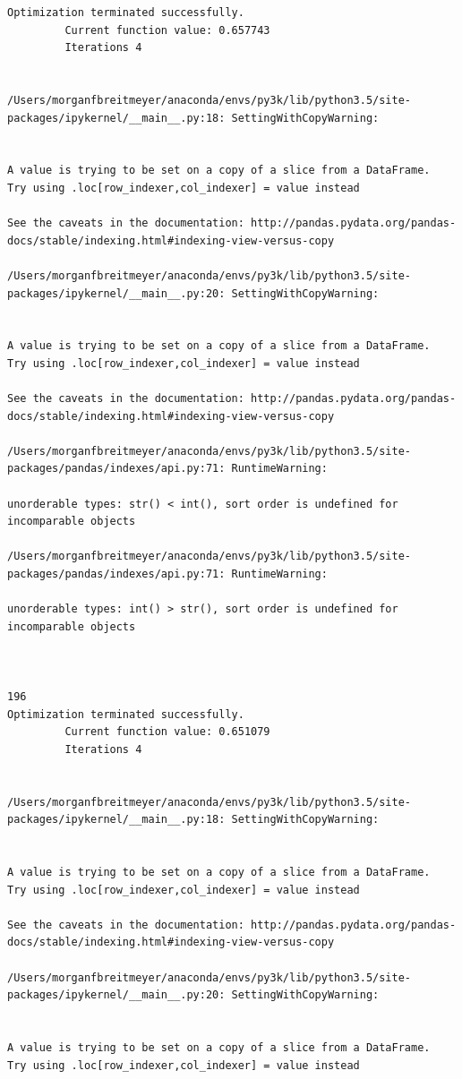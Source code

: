 \begin{lstlisting}
Optimization terminated successfully.
         Current function value: 0.657743
         Iterations 4


/Users/morganfbreitmeyer/anaconda/envs/py3k/lib/python3.5/site-packages/ipykernel/__main__.py:18: SettingWithCopyWarning:


A value is trying to be set on a copy of a slice from a DataFrame.
Try using .loc[row_indexer,col_indexer] = value instead

See the caveats in the documentation: http://pandas.pydata.org/pandas-docs/stable/indexing.html#indexing-view-versus-copy

/Users/morganfbreitmeyer/anaconda/envs/py3k/lib/python3.5/site-packages/ipykernel/__main__.py:20: SettingWithCopyWarning:


A value is trying to be set on a copy of a slice from a DataFrame.
Try using .loc[row_indexer,col_indexer] = value instead

See the caveats in the documentation: http://pandas.pydata.org/pandas-docs/stable/indexing.html#indexing-view-versus-copy

/Users/morganfbreitmeyer/anaconda/envs/py3k/lib/python3.5/site-packages/pandas/indexes/api.py:71: RuntimeWarning:

unorderable types: str() < int(), sort order is undefined for incomparable objects

/Users/morganfbreitmeyer/anaconda/envs/py3k/lib/python3.5/site-packages/pandas/indexes/api.py:71: RuntimeWarning:

unorderable types: int() > str(), sort order is undefined for incomparable objects



196
Optimization terminated successfully.
         Current function value: 0.651079
         Iterations 4


/Users/morganfbreitmeyer/anaconda/envs/py3k/lib/python3.5/site-packages/ipykernel/__main__.py:18: SettingWithCopyWarning:


A value is trying to be set on a copy of a slice from a DataFrame.
Try using .loc[row_indexer,col_indexer] = value instead

See the caveats in the documentation: http://pandas.pydata.org/pandas-docs/stable/indexing.html#indexing-view-versus-copy

/Users/morganfbreitmeyer/anaconda/envs/py3k/lib/python3.5/site-packages/ipykernel/__main__.py:20: SettingWithCopyWarning:


A value is trying to be set on a copy of a slice from a DataFrame.
Try using .loc[row_indexer,col_indexer] = value instead


\end{lstlisting}
